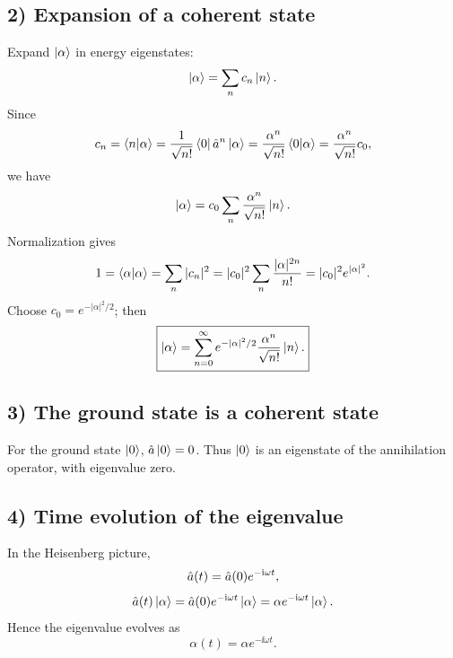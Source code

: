 \subsection*{2) Expansion of a coherent state}
Expand $\left|\alpha\right\rangle$ in energy eigenstates:
\begin{equation}
\left|\alpha\right\rangle=\sum_n c_n\left|n\right\rangle.
\end{equation}
Since
\begin{equation}
c_n=\left\langle n\middle|\alpha\right\rangle
=\frac1{\sqrt{n!}}\left\langle0\right|\hat{a}^n\left|\alpha\right\rangle
=\frac{\alpha^n}{\sqrt{n!}}\left\langle0\middle|\alpha\right\rangle
=\frac{\alpha^n}{\sqrt{n!}}c_0,
\end{equation}
we have
\begin{equation}
\left|\alpha\right\rangle=c_0\sum_n\frac{\alpha^n}{\sqrt{n!}}\left|n\right\rangle.
\end{equation}
Normalization gives
\begin{equation}
1=\left\langle\alpha\middle|\alpha\right\rangle=\sum_n|c_n|^2
=|c_0|^2\sum_n\frac{|\alpha|^{2n}}{n!}
=|c_0|^2e^{|\alpha|^2}.
\end{equation}
Choose $c_0=e^{-|\alpha|^2/2}$; then
\begin{equation}
\boxed{\left|\alpha\right\rangle=\sum_{n=0}^{\infty}
e^{-|\alpha|^2/2}\frac{\alpha^n}{\sqrt{n!}}\left|n\right\rangle.}
\end{equation}

\subsection*{3) The ground state is a coherent state}
For the ground state $\left|0\right\rangle$, $\hat{a}\left|0\right\rangle=0$. Thus $\left|0\right\rangle$ is an eigenstate of the annihilation operator, with eigenvalue zero.

\subsection*{4) Time evolution of the eigenvalue}
In the Heisenberg picture,
\begin{equation}
\hat{a}(t)=\hat{a}(0)e^{-\mathrm{i}\omega t},
\end{equation}
\begin{equation}
\hat{a}(t)\left|\alpha\right\rangle=\hat{a}(0)e^{-\mathrm{i}\omega t}\left|\alpha\right\rangle
=\alpha e^{-\mathrm{i}\omega t}\left|\alpha\right\rangle.
\end{equation}
Hence the eigenvalue evolves as
\begin{equation}
\boxed{\alpha(t)=\alpha e^{-\ii\omega t}.}
\end{equation}

